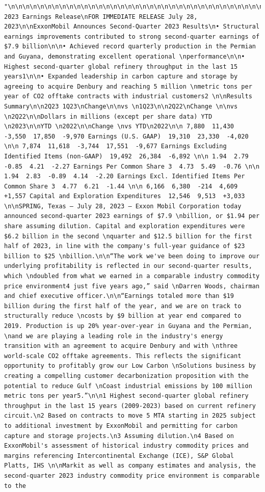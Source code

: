 \documentclass[
  letterpaper,
  DIV=11,
  numbers=noendperiod]{scrreprt}
\begin{document}
\begin{verbatim}
"\n\n\n\n\n\n\n\n\n\n\n\n\n\n\n\n\n\n\n\n\n\n\n\n\n\n\n\n\n\n\n\n\n\n\nf8k2Q23991\n\n\n2Q 2023 Earnings Release\nFOR IMMEDIATE RELEASE July 28, 2023\n\nExxonMobil Announces Second-Quarter 2023 Results\n• Structural earnings improvements contributed to strong second-quarter earnings of $7.9 billion\n\n• Achieved record quarterly production in the Permian and Guyana, demonstrating excellent operational \nperformance\n\n• Highest second-quarter global refinery throughput in the last 15 years1\n\n• Expanded leadership in carbon capture and storage by agreeing to acquire Denbury and reaching 5 million \nmetric tons per year of CO2 offtake contracts with industrial customers2 \n\nResults Summary\n\n2Q23 1Q23\nChange\n\nvs \n1Q23\n\n2Q22\nChange \n\nvs \n2Q22\n\nDollars in millions (except per share data) YTD \n2023\n\nYTD \n2022\n\nChange \nvs YTD\n2022\n\n 7,880  11,430  -3,550  17,850  -9,970 Earnings (U.S. GAAP)  19,310  23,330  -4,020 \n\n 7,874  11,618  -3,744  17,551  -9,677 Earnings Excluding Identified Items (non-GAAP)  19,492  26,384  -6,892 \n\n 1.94  2.79  -0.85  4.21  -2.27 Earnings Per Common Share 3  4.73  5.49  -0.76 \n\n 1.94  2.83  -0.89  4.14  -2.20 Earnings Excl. Identified Items Per Common Share 3  4.77  6.21  -1.44 \n\n 6,166  6,380  -214  4,609  +1,557 Capital and Exploration Expenditures  12,546  9,513  +3,033 \n\nSPRING, Texas – July 28, 2023 – Exxon Mobil Corporation today announced second-quarter 2023 earnings of $7.9 \nbillion, or $1.94 per share assuming dilution. Capital and exploration expenditures were $6.2 billion in the second \nquarter and $12.5 billion for the first half of 2023, in line with the company's full-year guidance of $23 billion to $25 \nbillion.\n\n“The work we've been doing to improve our underlying profitability is reflected in our second-quarter results, which \ndoubled from what we earned in a comparable industry commodity price environment4 just five years ago,” said \nDarren Woods, chairman and chief executive officer.\n\n“Earnings totaled more than $19 billion during the first half of the year, and we are on track to structurally reduce \ncosts by $9 billion at year end compared to 2019. Production is up 20% year-over-year in Guyana and the Permian, \nand we are playing a leading role in the industry's energy transition with an agreement to acquire Denbury and with \nthree world-scale CO2 offtake agreements. This reflects the significant opportunity to profitably grow our Low Carbon \nSolutions business by creating a compelling customer decarbonization proposition with the potential to reduce Gulf \nCoast industrial emissions by 100 million metric tons per year5.”\n\n1 Highest second-quarter global refinery throughput in the last 15 years (2009-2023) based on current refinery circuit.\n2 Based on contracts to move 5 MTA starting in 2025 subject to additional investment by ExxonMobil and permitting for carbon capture and storage projects.\n3 Assuming dilution.\n4 Based on ExxonMobil's assessment of historical industry commodity prices and margins referencing Intercontinental Exchange (ICE), S&P Global Platts, IHS \n\nMarkit as well as company estimates and analysis, the second-quarter 2023 industry commodity price environment is comparable to the 
\end{verbatim}
\end{document}
